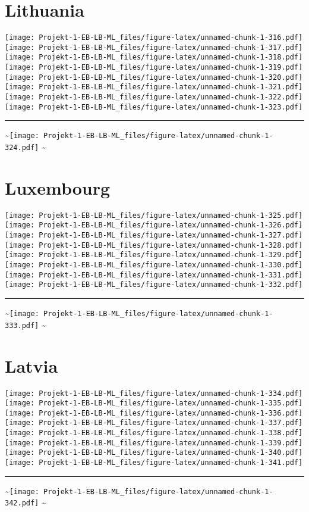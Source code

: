 \documentclass[]{article}
\begin{document}
\section{Lithuania}\label{lithuania}

\texttt{[image: Projekt-1-EB-LB-ML\_files/figure-latex/unnamed-chunk-1-316.pdf]}
\texttt{[image: Projekt-1-EB-LB-ML\_files/figure-latex/unnamed-chunk-1-317.pdf]}
\texttt{[image: Projekt-1-EB-LB-ML\_files/figure-latex/unnamed-chunk-1-318.pdf]}
\texttt{[image: Projekt-1-EB-LB-ML\_files/figure-latex/unnamed-chunk-1-319.pdf]}
\texttt{[image: Projekt-1-EB-LB-ML\_files/figure-latex/unnamed-chunk-1-320.pdf]}
\texttt{[image: Projekt-1-EB-LB-ML\_files/figure-latex/unnamed-chunk-1-321.pdf]}
\texttt{[image: Projekt-1-EB-LB-ML\_files/figure-latex/unnamed-chunk-1-322.pdf]}
\texttt{[image: Projekt-1-EB-LB-ML\_files/figure-latex/unnamed-chunk-1-323.pdf]}
\bigskip\hrule\bigskip
\textasciitilde{}\hfill\texttt{[image: Projekt-1-EB-LB-ML\_files/figure-latex/unnamed-chunk-1-324.pdf]}
\hfill \textasciitilde{} \vfill\eject

\section{Luxembourg}\label{luxembourg}

\texttt{[image: Projekt-1-EB-LB-ML\_files/figure-latex/unnamed-chunk-1-325.pdf]}
\texttt{[image: Projekt-1-EB-LB-ML\_files/figure-latex/unnamed-chunk-1-326.pdf]}
\texttt{[image: Projekt-1-EB-LB-ML\_files/figure-latex/unnamed-chunk-1-327.pdf]}
\texttt{[image: Projekt-1-EB-LB-ML\_files/figure-latex/unnamed-chunk-1-328.pdf]}
\texttt{[image: Projekt-1-EB-LB-ML\_files/figure-latex/unnamed-chunk-1-329.pdf]}
\texttt{[image: Projekt-1-EB-LB-ML\_files/figure-latex/unnamed-chunk-1-330.pdf]}
\texttt{[image: Projekt-1-EB-LB-ML\_files/figure-latex/unnamed-chunk-1-331.pdf]}
\texttt{[image: Projekt-1-EB-LB-ML\_files/figure-latex/unnamed-chunk-1-332.pdf]}
\bigskip\hrule\bigskip
\textasciitilde{}\hfill\texttt{[image: Projekt-1-EB-LB-ML\_files/figure-latex/unnamed-chunk-1-333.pdf]}
\hfill \textasciitilde{} \vfill\eject

\section{Latvia}\label{latvia}

\texttt{[image: Projekt-1-EB-LB-ML\_files/figure-latex/unnamed-chunk-1-334.pdf]}
\texttt{[image: Projekt-1-EB-LB-ML\_files/figure-latex/unnamed-chunk-1-335.pdf]}
\texttt{[image: Projekt-1-EB-LB-ML\_files/figure-latex/unnamed-chunk-1-336.pdf]}
\texttt{[image: Projekt-1-EB-LB-ML\_files/figure-latex/unnamed-chunk-1-337.pdf]}
\texttt{[image: Projekt-1-EB-LB-ML\_files/figure-latex/unnamed-chunk-1-338.pdf]}
\texttt{[image: Projekt-1-EB-LB-ML\_files/figure-latex/unnamed-chunk-1-339.pdf]}
\texttt{[image: Projekt-1-EB-LB-ML\_files/figure-latex/unnamed-chunk-1-340.pdf]}
\texttt{[image: Projekt-1-EB-LB-ML\_files/figure-latex/unnamed-chunk-1-341.pdf]}
\bigskip\hrule\bigskip
\textasciitilde{}\hfill\texttt{[image: Projekt-1-EB-LB-ML\_files/figure-latex/unnamed-chunk-1-342.pdf]}
\hfill \textasciitilde{} \vfill\eject
\end{document}
